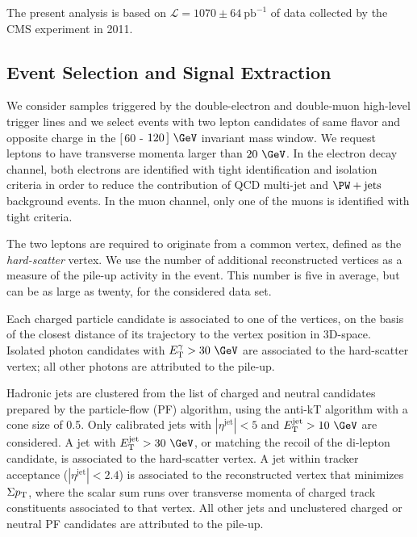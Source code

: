 The present analysis is based on $\mathcal{L} = 1070\pm64~\mathrm{pb}^{-1}$ of data collected by the CMS experiment in 2011.

\subsection{Event Selection and Signal Extraction}

We consider samples triggered by the double-electron and double-muon high-level trigger lines and we select events with two lepton candidates of same flavor and opposite charge in the $[\,60$ - $120\,]~\GeV$ invariant mass window. We request leptons to have transverse momenta larger than $20~\GeV$. In the electron decay channel,  both electrons are  identified with tight identification and isolation criteria in order to reduce the contribution of QCD multi-jet and $\PW+{\mathrm {jets}}$ background events.  In the muon channel, only one of the muons is identified with tight criteria.  

The two leptons are required to originate from a common vertex, defined as the {\it hard-scatter} vertex. We use the number of additional reconstructed vertices as a measure of the pile-up activity in the event. This number is five in average, but can be as large as twenty, for the considered data set. 

Each charged particle candidate is associated to one of the vertices, on the basis of the closest distance of its trajectory to the vertex position in 3D-space.  Isolated photon candidates with $\ET^{\gamma}>30~\GeV$ are associated to the hard-scatter vertex; all other photons are attributed to the pile-up.  

Hadronic jets are clustered  from the list of charged and neutral candidates prepared by the particle-flow (PF) algorithm, using the anti-kT algorithm with a cone size of 0.5. Only calibrated jets with  $|\eta^{\mathrm{jet}}|<5$ and $\ET^{\mathrm{jet}}>10~\GeV$ are considered.  A jet with $\ET^{\mathrm{jet}}>30~\GeV$, or matching the recoil of the di-lepton candidate, is associated to the hard-scatter vertex. A jet within tracker acceptance ($|\eta^{\mathrm{jet}}|<2.4$) is associated to the reconstructed vertex that minimizes $\Sigma p_{\mathrm{T}}$, where the scalar sum runs over transverse momenta of charged track constituents associated to that vertex. All other jets and unclustered charged or neutral PF candidates are attributed to the pile-up.

